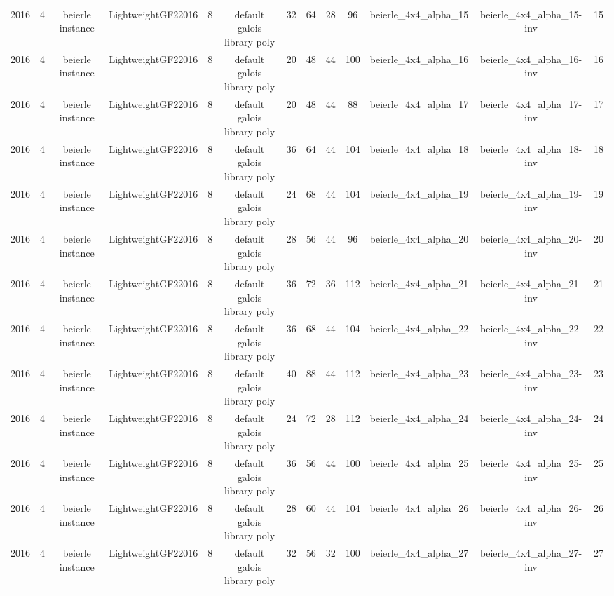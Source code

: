 \begin{tabular}{c c c c c c c c c c c c c}
2016 & 4 & beierle instance & LightweightGF22016 & 8 & default galois library poly & 32 & 64 & 28 & 96 & beierle_4x4_alpha_15 & beierle_4x4_alpha_15-inv & 15 \\
2016 & 4 & beierle instance & LightweightGF22016 & 8 & default galois library poly & 20 & 48 & 44 & 100 & beierle_4x4_alpha_16 & beierle_4x4_alpha_16-inv & 16 \\
2016 & 4 & beierle instance & LightweightGF22016 & 8 & default galois library poly & 20 & 48 & 44 & 88 & beierle_4x4_alpha_17 & beierle_4x4_alpha_17-inv & 17 \\
2016 & 4 & beierle instance & LightweightGF22016 & 8 & default galois library poly & 36 & 64 & 44 & 104 & beierle_4x4_alpha_18 & beierle_4x4_alpha_18-inv & 18 \\
2016 & 4 & beierle instance & LightweightGF22016 & 8 & default galois library poly & 24 & 68 & 44 & 104 & beierle_4x4_alpha_19 & beierle_4x4_alpha_19-inv & 19 \\
2016 & 4 & beierle instance & LightweightGF22016 & 8 & default galois library poly & 28 & 56 & 44 & 96 & beierle_4x4_alpha_20 & beierle_4x4_alpha_20-inv & 20 \\
2016 & 4 & beierle instance & LightweightGF22016 & 8 & default galois library poly & 36 & 72 & 36 & 112 & beierle_4x4_alpha_21 & beierle_4x4_alpha_21-inv & 21 \\
2016 & 4 & beierle instance & LightweightGF22016 & 8 & default galois library poly & 36 & 68 & 44 & 104 & beierle_4x4_alpha_22 & beierle_4x4_alpha_22-inv & 22 \\
2016 & 4 & beierle instance & LightweightGF22016 & 8 & default galois library poly & 40 & 88 & 44 & 112 & beierle_4x4_alpha_23 & beierle_4x4_alpha_23-inv & 23 \\
2016 & 4 & beierle instance & LightweightGF22016 & 8 & default galois library poly & 24 & 72 & 28 & 112 & beierle_4x4_alpha_24 & beierle_4x4_alpha_24-inv & 24 \\
2016 & 4 & beierle instance & LightweightGF22016 & 8 & default galois library poly & 36 & 56 & 44 & 100 & beierle_4x4_alpha_25 & beierle_4x4_alpha_25-inv & 25 \\
2016 & 4 & beierle instance & LightweightGF22016 & 8 & default galois library poly & 28 & 60 & 44 & 104 & beierle_4x4_alpha_26 & beierle_4x4_alpha_26-inv & 26 \\
2016 & 4 & beierle instance & LightweightGF22016 & 8 & default galois library poly & 32 & 56 & 32 & 100 & beierle_4x4_alpha_27 & beierle_4x4_alpha_27-inv & 27 \\

\end{tabular}
